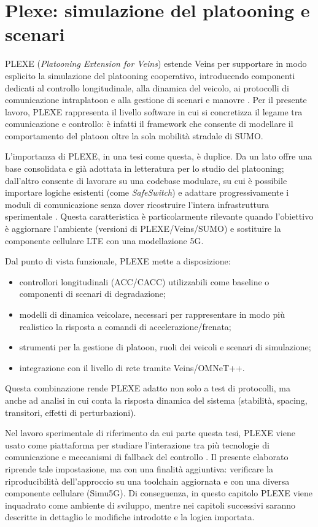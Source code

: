 \section{Plexe: simulazione del platooning e scenari}
\label{env:plexe}

PLEXE (\emph{Platooning Extension for Veins}) estende Veins per supportare in modo esplicito la simulazione del platooning cooperativo, introducendo componenti dedicati al controllo longitudinale, alla dinamica del veicolo, ai protocolli di comunicazione intraplatoon e alla gestione di scenari e manovre \cite{segata2014plexe}. Per il presente lavoro, PLEXE rappresenta il livello software in cui si concretizza il legame tra comunicazione e controllo: è infatti il framework che consente di modellare il comportamento del platoon oltre la sola mobilità stradale di SUMO.

L’importanza di PLEXE, in una tesi come questa, è duplice. Da un lato offre una base consolidata e già adottata in letteratura per lo studio del platooning; dall’altro consente di lavorare su una codebase modulare, su cui è possibile importare logiche esistenti (come \emph{SafeSwitch}) e adattare progressivamente i moduli di comunicazione senza dover ricostruire l’intera infrastruttura sperimentale \cite{segata2014plexe,segata2023multi-technology}. Questa caratteristica è particolarmente rilevante quando l’obiettivo è aggiornare l’ambiente (versioni di PLEXE/Veins/SUMO) e sostituire la componente cellulare LTE con una modellazione 5G.

Dal punto di vista funzionale, PLEXE mette a disposizione:
\begin{itemize}
\item controllori longitudinali (ACC/CACC) utilizzabili come baseline o componenti di scenari di degradazione;
\item modelli di dinamica veicolare, necessari per rappresentare in modo più realistico la risposta a comandi di accelerazione/frenata;
\item strumenti per la gestione di platoon, ruoli dei veicoli e scenari di simulazione;
\item integrazione con il livello di rete tramite Veins/OMNeT++.
\end{itemize}
Questa combinazione rende PLEXE adatto non solo a test di protocolli, ma anche ad analisi in cui conta la risposta dinamica del sistema (stabilità, spacing, transitori, effetti di perturbazioni).

Nel lavoro sperimentale di riferimento da cui parte questa tesi, PLEXE viene usato come piattaforma per studiare l’interazione tra più tecnologie di comunicazione e meccanismi di fallback del controllo \cite{segata2023multi-technology}. Il presente elaborato riprende tale impostazione, ma con una finalità aggiuntiva: verificare la riproducibilità dell’approccio su una toolchain aggiornata e con una diversa componente cellulare (Simu5G). Di conseguenza, in questo capitolo PLEXE viene inquadrato come ambiente di sviluppo, mentre nei capitoli successivi saranno descritte in dettaglio le modifiche introdotte e la logica importata.

